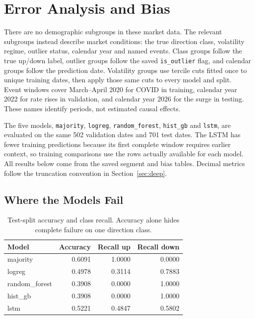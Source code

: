\section{Error Analysis and Bias}
\label{sec:error-bias}

There are no demographic subgroups in these market data. The relevant subgroups instead describe market conditions: the true direction class, volatility regime, outlier status, calendar year and named events. Class groups follow the true up/down label, outlier groups follow the saved \texttt{is\_outlier} flag, and calendar groups follow the prediction date. Volatility groups use tercile cuts fitted once to unique training dates, then apply those same cuts to every model and split. Event windows cover March--April 2020 for COVID in training, calendar year 2022 for rate rises in validation, and calendar year 2026 for the surge in testing. These names identify periods, not estimated causal effects.

The five models, \texttt{majority}, \texttt{logreg}, \texttt{random\_forest}, \texttt{hist\_gb} and \texttt{lstm}, are evaluated on the same 502 validation dates and 701 test dates. The LSTM has fewer training predictions because its first complete window requires earlier context, so training comparisons use the rows actually available for each model. All results below come from the saved segment and bias tables. Decimal metrics follow the truncation convention in Section~\ref{sec:deep}.

\subsection{Where the Models Fail}
\begin{table}[H]
    \centering
    \small
    \begin{tabular}{lrrr}
        \toprule
        Model & Accuracy & Recall up & Recall down \\
        \midrule
        majority       & 0.6091 & 1.0000 & 0.0000 \\
        logreg         & 0.4978 & 0.3114 & 0.7883 \\
        random\_forest & 0.3908 & 0.0000 & 1.0000 \\
        hist\_gb       & 0.3908 & 0.0000 & 1.0000 \\
        lstm           & 0.5221 & 0.4847 & 0.5802 \\
        \bottomrule
    \end{tabular}
    \caption{Test-split accuracy and class recall. Accuracy alone hides complete failure on one direction class.}
    \label{tab:b-error-test}
\end{table}

